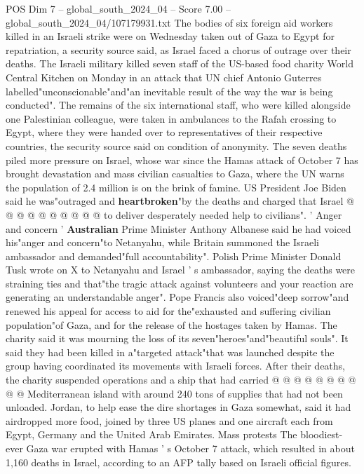 \begin{textsample}{POS Dim 7 – global\_south\_2024\_04 – Score 7.00 – global\_south\_2024\_04/107179931.txt}  \label{ex:f7_pos_167}
The bodies of six foreign aid workers killed in an Israeli strike were on Wednesday taken out of Gaza to Egypt for repatriation, a security source said, as Israel faced a chorus of outrage over their deaths.
The Israeli military killed seven staff of the US-based food charity World Central Kitchen on Monday in an attack that UN chief Antonio Guterres labelled"unconscionable"and"an inevitable result of the way the war is being conducted".
The remains of the six international staff, who were killed alongside one Palestinian colleague, were taken in ambulances to the Rafah crossing to Egypt, where they were handed over to representatives of their respective countries, the security source said on condition of anonymity.
The seven deaths piled more pressure on Israel, whose war since the Hamas attack of October 7 has brought devastation and mass civilian casualties to Gaza, where the UN warns the population of 2.4 million is on the brink of famine.
US President Joe Biden said he was"outraged and \textbf{heartbroken}"by the deaths and charged that Israel @ @ @ @ @ @ @ @ @ @ to deliver desperately needed help to civilians". ' Anger and concern ' \textbf{Australian} Prime Minister Anthony Albanese said he had voiced his"anger and concern"to Netanyahu, while Britain summoned the Israeli ambassador and demanded"full accountability".
Polish Prime Minister Donald Tusk wrote on X to Netanyahu and Israel ' s ambassador, saying the deaths were straining ties and that"the tragic attack against volunteers and your reaction are generating an understandable anger".
Pope Francis also voiced"deep sorrow"and renewed his appeal for access to aid for the"exhausted and suffering civilian population"of Gaza, and for the release of the hostages taken by Hamas.
The charity said it was mourning the loss of its seven"heroes"and"beautiful souls".
It said they had been killed in a"targeted attack"that was launched despite the group having coordinated its movements with Israeli forces.
After their deaths, the charity suspended operations and a ship that had carried @ @ @ @ @ @ @ @ @ @ Mediterranean island with around 240 tons of supplies that had not been unloaded.
Jordan, to help ease the dire shortages in Gaza somewhat, said it had airdropped more food, joined by three US planes and one aircraft each from Egypt, Germany and the United Arab Emirates.
Mass protests The bloodiest-ever Gaza war erupted with Hamas ' s October 7 attack, which resulted in about 1,160 deaths in Israel, according to an AFP tally based on Israeli official figures.

\end{textsample}
